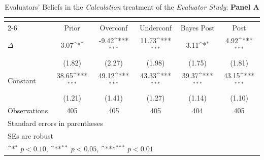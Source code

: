 \begin{table}[htbp]\centering
\def\sym#1{\ifmmode^{#1}\else\(^{#1}\)\fi}
\caption{Evaluators' Beliefs in the \textit{Calculation} treatment of the \textit{Evaluator Study}: \textbf{Panel A}}
\begin{tabular}{l*{5}{c}}
\hline\hline
                &\multicolumn{5}{c}{}                                                                          \\\cmidrule(lr){2-6}
                &\multicolumn{1}{c}{Prior}&\multicolumn{1}{c}{Overconf}&\multicolumn{1}{c}{Underconf}&\multicolumn{1}{c}{Bayes Post}&\multicolumn{1}{c}{Post}\\
\hline
$\Delta$        &     3.07\sym{*}  &    -9.42\sym{***}&    11.73\sym{***}&     3.11\sym{*}  &     4.92\sym{***}\\
                &   (1.82)         &   (2.27)         &   (1.98)         &   (1.75)         &   (1.81)         \\
Constant        &    38.65\sym{***}&    49.12\sym{***}&    43.33\sym{***}&    39.37\sym{***}&    43.15\sym{***}\\
                &   (1.21)         &   (1.41)         &   (1.27)         &   (1.14)         &   (1.10)         \\
\hline
Observations    &      405         &      405         &      405         &      404         &      405         \\
\hline\hline
\multicolumn{6}{l}{\footnotesize Standard errors in parentheses}\\
\multicolumn{6}{l}{\footnotesize SEs are robust}\\
\multicolumn{6}{l}{\footnotesize \sym{*} \(p<0.10\), \sym{**} \(p<0.05\), \sym{***} \(p<0.01\)}\\
\end{tabular}
\end{table}
